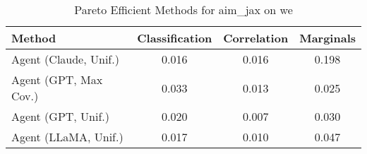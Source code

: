 \begin{table}[t!]
    \centering
    \caption{Pareto Efficient Methods for aim_jax on we}
    \label{tab:pareto_efficient_methods_aim_jax_we}
    \begin{tabular}{lccc}
    \toprule
    Method & Classification & Correlation & Marginals \\
    \midrule
    Agent (Claude, Unif.) & \cellcolor{gold!30}0.016 & 0.016 & 0.198 \\
    Agent (GPT, Max Cov.) & 0.033 & \cellcolor{bronze!30}0.013 & \cellcolor{gold!30}0.025 \\
    Agent (GPT, Unif.) & \cellcolor{bronze!30}0.020 & \cellcolor{gold!30}0.007 & \cellcolor{silver!30}0.030 \\
    Agent (LLaMA, Unif.) & \cellcolor{silver!30}0.017 & \cellcolor{silver!30}0.010 & \cellcolor{bronze!30}0.047 \\
    \bottomrule
    \end{tabular}
\end{table}